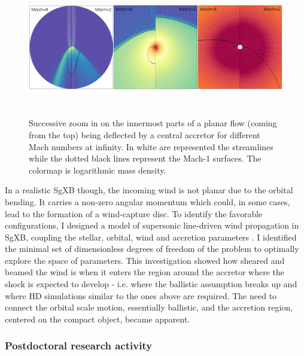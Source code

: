 \documentclass[a4paper,12pt,onecolumn]{article}
\newcommand{\sgx}{SgXB\xspace}
\begin{document}
\begin{figure}[!b]
\begin{center}
\hspace*{-0.8cm}
\includegraphics[height=6cm, width=17cm]{Figures/zoom_BHL.png}	
\caption{Successive zoom in on the innermost parts of a planar flow (coming from the top) being deflected by a central accretor for different Mach numbers at infinity. In white are represented the streamlines while the dotted black lines represent the Mach-1 surfaces. The colormap is logarithmic mass density.}
\label{fig:zoom_BHL}
\end{center}
\end{figure}
\indent In a realistic \sgx though, the incoming wind is not planar due to the orbital bending. It carries a non-zero angular momentum which could, in some cases, lead to the formation of a wind-capture disc. To identify the favorable configurations, I designed a model of supersonic line-driven wind propagation in \sgx, coupling the stellar, orbital, wind and accretion parameters \citep{ElMellah2016a}. I identified the minimal set of dimensionless degrees of freedom of the problem to optimally explore the space of parameters. This investigation showed how sheared and beamed the wind is when it enters the region around the accretor where the shock is expected to develop - i.e. where the ballistic assumption breaks up and where HD simulations similar to the ones above are required. The need to connect the orbital scale motion, essentially ballistic, and the accretion region, centered on the compact object, became apparent.\\



\subsubsection*{Postdoctoral research activity}
\end{document}
